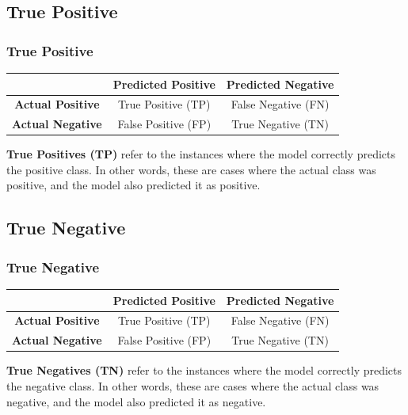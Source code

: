 \documentclass[aspectratio=169]{beamer} %
\begin{document}
	\subsection{True Positive}
	\begin{frame}
	\frametitle{True Positive}
		\begin{center}
			\begin{tabular}{|c|c|c|}
				\hline
				& \textbf{Predicted Positive} & \textbf{Predicted Negative} \\
				\hline
				\textbf{Actual Positive} & {\color{blue}True Positive (TP)} & False Negative (FN) \\
				\hline
				\textbf{Actual Negative} & False Positive (FP) & True Negative (TN) \\
				\hline
			\end{tabular}
		\end{center}

		{\bf True Positives (TP)} refer to the instances where the model correctly predicts the positive class. In other words, these are cases where the actual class was positive, and the model also predicted it as positive.

	\end{frame}
	\subsection{True Negative}
	\begin{frame}
	\frametitle{True Negative}
		\begin{center}
			\begin{tabular}{|c|c|c|}
				\hline
				& \textbf{Predicted Positive} & \textbf{Predicted Negative} \\
				\hline
				\textbf{Actual Positive} & True Positive (TP) & False Negative (FN) \\
				\hline
				\textbf{Actual Negative} & False Positive (FP) & {\color{blue}True Negative (TN)} \\
				\hline
			\end{tabular}
		\end{center}

		{\bf True Negatives (TN)} refer to the instances where the model correctly predicts the negative class. In other words, these are cases where the actual class was negative, and the model also predicted it as negative.
	\end{frame}
\end{document}
